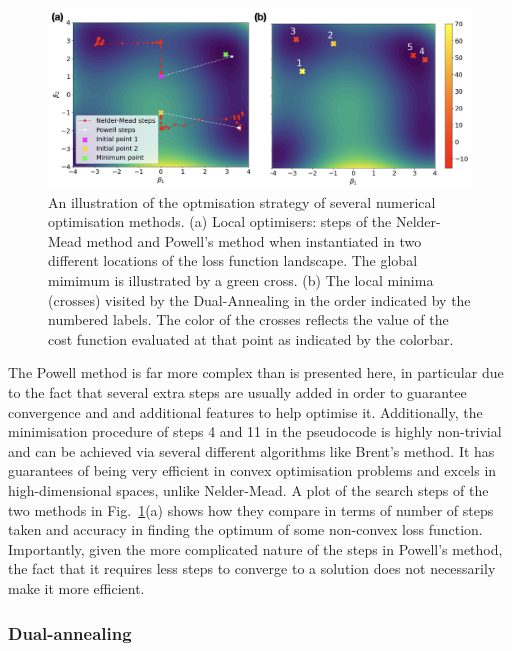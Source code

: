 \begin{figure}[t]
\centering
\includegraphics[width=\linewidth]{images/optimiser_plots.png} \caption[Visualising optimisers in action]{An illustration of the optmisation strategy of several numerical optimisation methods. (a) Local optimisers: steps of the Nelder-Mead method and Powell's method when instantiated in two different locations of the loss function landscape. The global mimimum is illustrated by a green cross. (b) The local minima (crosses) visited by the Dual-Annealing in the order indicated by the numbered labels. The color of the crosses reflects the value of the cost function evaluated at that point as indicated by the colorbar.}\label{fig:optimisers}
\end{figure}

The Powell method is far more complex than is presented here, in particular due to the fact that several extra steps are usually added in order to guarantee convergence and and additional features to help optimise it. Additionally, the minimisation procedure of steps 4 and 11 in the pseudocode is highly non-trivial and can be achieved via several different algorithms like Brent's method\cite{brent_algorithms_2002}. It has guarantees of being very efficient in convex optimisation problems and excels in high-dimensional spaces, unlike Nelder-Mead. A plot of the search steps of the two methods in Fig.~\ref{fig:optimisers}(a) shows how they compare in terms of number of steps taken and accuracy in finding the optimum of some non-convex loss function. Importantly, given the more complicated nature of the steps in Powell's method, the fact that it requires less steps to converge to a solution does not necessarily make it more efficient.

\subsubsection{Dual-annealing}\label{sec:3.1.3.3_dual_annealing}

